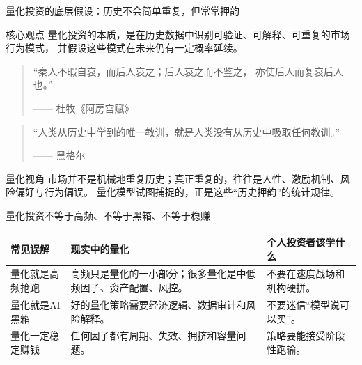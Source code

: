 \documentclass[UTF8,aspectratio=169,11pt]{ctexbeamer}
\begin{document}
\begin{frame}{量化投资的底层假设：历史不会简单重复，但常常押韵}
\small

\begin{block}{核心观点}
量化投资的本质，是在历史数据中识别可验证、可解释、可重复的市场行为模式，
并假设这些模式在未来仍有一定概率延续。
\end{block}

\vspace{0.25cm}

\begin{quote}
\large
“秦人不暇自哀，而后人哀之；后人哀之而不鉴之，
亦使后人而复哀后人也。”

\vspace{0.15cm}
\hfill —— 杜牧《阿房宫赋》
\end{quote}

\vspace{0.2cm}

\begin{quote}
\large
“人类从历史中学到的唯一教训，就是人类没有从历史中吸取任何教训。”

\vspace{0.15cm}
\hfill —— 黑格尔
\end{quote}

\vspace{0.25cm}

\begin{alertblock}{量化视角}
市场并不是机械地重复历史；真正重复的，往往是人性、激励机制、风险偏好与行为偏误。
量化模型试图捕捉的，正是这些“历史押韵”的统计规律。
\end{alertblock}

\end{frame}

\begin{frame}{量化投资不等于高频、不等于黑箱、不等于稳赚}
\begin{tabularx}{\textwidth}{p{3.0cm}X X}
\toprule
\textbf{常见误解} & \textbf{现实中的量化} & \textbf{个人投资者该学什么} \\
\midrule
量化就是高频抢跑 & 高频只是量化的一小部分；很多量化是中低频因子、资产配置、风控。 & 不要在速度战场和机构硬拼。 \\
量化就是AI黑箱 & 好的量化策略需要经济逻辑、数据审计和风险解释。 & 不要迷信“模型说可以买”。 \\
量化一定稳定赚钱 & 任何因子都有周期、失效、拥挤和容量问题。 & 策略要能接受阶段性跑输。 \\
\bottomrule
\end{tabularx}
\vspace{0.35cm}
\begin{center}
\end{center}
\end{frame}
\end{document}
